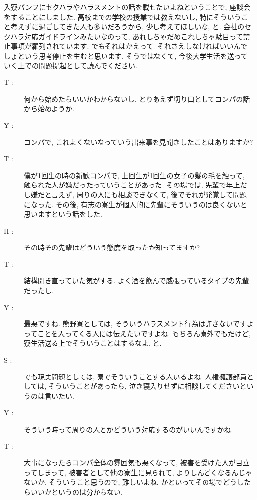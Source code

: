 \documentclass[10pt,b5jsbook,dvips,dvipdfmx,openany]{jsbook}
\theoremstyle{definition}
\begin{document}
		 入寮パンフにセクハラやハラスメントの話を載せたいよねということで, 座談会をすることにしました. 高校までの学校の授業では教えないし, 特にそういうこと考えずに過ごしてきた人も多いだろうから, 少し考えてほしいな, と. 会社のセクハラ対応ガイドラインみたいなのって, あれしちゃだめこれしちゃ駄目って禁止事項が羅列されています. でもそれはかえって, それさえしなければいいんでしょという思考停止を生むと思います. そうではなくて, 今後大学生活を送っていく上での問題提起として読んでください. 
\small
		\begin{multicols}{2}

		\begin{description}

		\item[ T : ] 何から始めたらいいかわからないし, とりあえず切り口としてコンパの話から始めようか. 

		\item[ Y : ] コンパで, これよくないなっていう出来事を見聞きしたことはありますか? 

		\item[ T : ] 僕が1回生の時の新歓コンパで, 上回生が1回生の女子の髪の毛を触って, 触られた人が嫌だったっていうことがあった. その場では, 先輩で年上だし嫌だと言えず, 周りの人にも相談できなくて, 後でそれが発覚して問題になった. その後, 有志の寮生が個人的に先輩にそういうのは良くないと思いますという話をした. 

		\item[ H : ]その時その先輩はどういう態度を取ったか知ってますか? 

		\item[ T : ] 結構開き直っていた気がする. よく酒を飲んで威張っているタイプの先輩だったし. 

		\item[ Y : ] 最悪ですね. 熊野寮としては, そういうハラスメント行為は許さないですよってことを入ってくる人には伝えたいですよね. もちろん寮外でもだけど, 寮生活送る上でそういうことはするなよ, と. 

		\item[ S : ] でも現実問題としては, 寮でそういうことする人いるよね. 人権擁護部員としては, そういうことがあったら, 泣き寝入りせずに相談してくださいというのは言いたい. 

		\item[ Y : ] そういう時って周りの人とかどういう対応するのがいいんですかね. 

		\item[ T : ] 大事になったらコンパ全体の雰囲気も悪くなって, 被害を受けた人が目立ってしまって, 被害者として他の寮生に見られて, よりしんどくなるんじゃないか, そういうこと思うので, 難しいよね. かといってその場でどうしたらいいかというのは分からない. 


\end{description}
\end{multicols}
\end{document}
